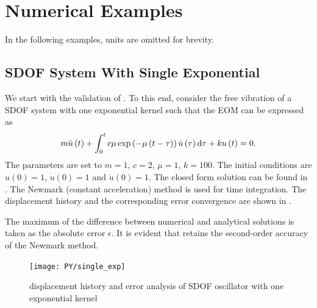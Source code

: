 \section{Numerical Examples}
In the following examples, units are omitted for brevity.
\subsection{SDOF System With Single Exponential}
We start with the validation of . To this end, consider the free vibration of a SDOF system with one exponential kernel such that the EOM can be expressed as
\begin{gather}
m\ddot{u}\left(t\right)+\int_0^tc\mu\exp\left(-\mu\left(t-\tau\right)\right)\dot{u}\left(\tau\right)\mathrm{d}\tau+ku\left(t\right)=0.
\end{gather}
The parameters are set to $m=1$, $c=2$, $\mu=1$, $k=100$.
The initial conditions are $u\left(0\right)=1$, $\dot{u}\left(0\right)=1$ and $\ddot{u}\left(0\right)=1$.
The closed form solution can be found in .
The Newmark (constant acceleration) method is used for time integration.
The displacement history and the corresponding error convergence are shown in .

The maximum of the difference between numerical and analytical solutions is taken as the absolute error $\epsilon$. It is evident that  retains the second-order accuracy of the Newmark method.
\begin{figure}[H]
\centering
\texttt{[image: PY/single\_exp]}
\caption{displacement history and error analysis of SDOF oscillator with one exponential kernel}\label{fig:sdof}
\end{figure}

